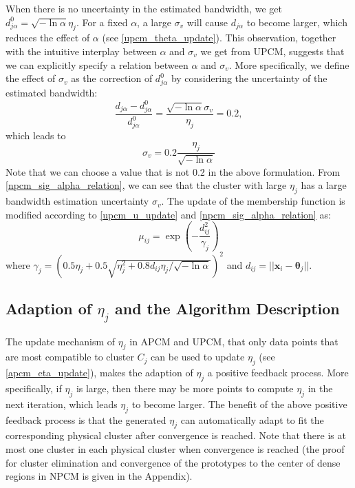 \documentclass[conference]{IEEEtran}
\theoremstyle{definition}
\begin{document}
When there is no uncertainty in the estimated bandwidth, we get $d_{j\alpha}^0=\sqrt{-\ln\alpha}\eta_j$. For a fixed $\alpha$, a large $\sigma_v$ will cause $d_{j\alpha}$ to become larger, which reduces the effect of $\alpha$ (see \eqref{upcm_theta_update}). This observation, together with the intuitive interplay between $\alpha$ and $\sigma_v$ we get from UPCM, suggests that we can explicitly specify a relation between $\alpha$ and $\sigma_v$. More specifically, we define the effect of $\sigma_v$ as the correction of $d_{j\alpha}^0$ by considering the uncertainty of the estimated bandwidth:
\begin{equation}
\frac{d_{j\alpha}-d_{j\alpha}^0}{d_{j\alpha}^0}=\frac{\sqrt{-\ln\alpha}\sigma_v}{\eta_j}=0.2,
\end{equation}
which leads to 
\begin{equation}
\label{npcm_sig_alpha_relation}
\sigma_v=0.2\frac{\eta_j}{\sqrt{-\ln\alpha}}
\end{equation}
Note that we can choose a value that is not 0.2 in the above formulation. From \eqref{npcm_sig_alpha_relation}, we can see that the cluster with large $\eta_j$ has a large bandwidth estimation uncertainty $\sigma_v$. The update of the membership function is modified according to \eqref{upcm_u_update} and \eqref{npcm_sig_alpha_relation} as:
\begin{equation}
\label{npcm_u_update}
\mu_{ij}=\exp\left(-\frac{d_{ij}^2}{\gamma_j}\right)
\end{equation}
where $\gamma_j=\left(0.5\eta_{j}+0.5\sqrt{\eta_{j}^{2}+0.8d_{ij}\eta_j/\sqrt{-\ln\alpha}}\right)^2$ and $d_{ij}=||\mathbf{x}_i-\boldsymbol{\theta}_j||$.
\subsection{Adaption of $\eta_j$ and the Algorithm Description}
\label{sec-3-4}
The update mechanism of $\eta_j$ in APCM and UPCM, that only data points that are most compatible to cluster $C_j$ can be used to update $\eta_j$ (see \eqref{apcm_eta_update}), makes the adaption of $\eta_j$ a positive feedback process. More specifically, if $\eta_j$ is large, then there may be more points to compute $\eta_j$ in the next iteration, which leads $\eta_j$ to become larger.
The benefit of the above positive feedback process is that the generated $\eta_j$ can automatically adapt to fit the corresponding physical cluster after convergence is reached.
Note that there is at most one cluster in each physical cluster when convergence is reached (the proof for cluster elimination and convergence of the prototypes to the center of dense regions in NPCM is given in the Appendix).
\end{document}
